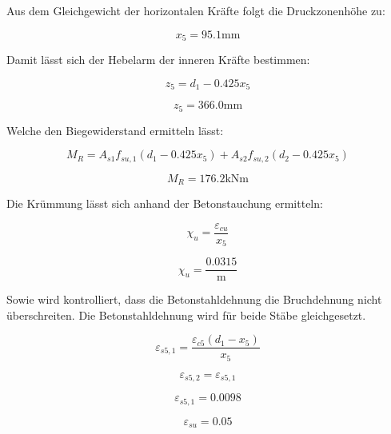 \documentclass[
  12pt,
  letterpaper,
  egregdoesnotlikesansseriftitles]{scrreprt}
\begin{document}
Aus dem Gleichgewicht der horizontalen Kräfte folgt die Druckzonenhöhe
zu:

\begin{equation}x_{5} = 95.1 \text{mm}\end{equation}

Damit lässt sich der Hebelarm der inneren Kräfte bestimmen:

\begin{equation}z_{5} = d_{1} - 0.425 x_{5}\end{equation}

\begin{equation}z_{5} = 366.0 \text{mm}\end{equation}

Welche den Biegewiderstand ermitteln lässt:

\begin{equation}M_{R} = A_{s 1} f_{su,1} \left(d_{1} - 0.425 x_{5}\right) + A_{s 2} f_{su,2} \left(d_{2} - 0.425 x_{5}\right)\end{equation}

\begin{equation}M_{R} = 176.2 \text{kN} \text{m}\end{equation}

Die Krümmung lässt sich anhand der Betonstauchung ermitteln:

\begin{equation}\chi_{u} = \frac{\varepsilon_{cu}}{x_{5}}\end{equation}

\begin{equation}\chi_{u} = \frac{0.0315}{\text{m}}\end{equation}

Sowie wird kontrolliert, dass die Betonstahldehnung die Bruchdehnung
nicht überschreiten. Die Betonstahldehnung wird für beide Stäbe
gleichgesetzt.

\begin{equation}\varepsilon_{s5,1} = \frac{\varepsilon_{c5} \left(d_{1} - x_{5}\right)}{x_{5}}\end{equation}

\begin{equation}\varepsilon_{s5,2} = \varepsilon_{s5,1}\end{equation}

\begin{equation}\varepsilon_{s5,1} = 0.0098\end{equation}

\begin{equation}\varepsilon_{su} = 0.05\end{equation}
\end{document}
